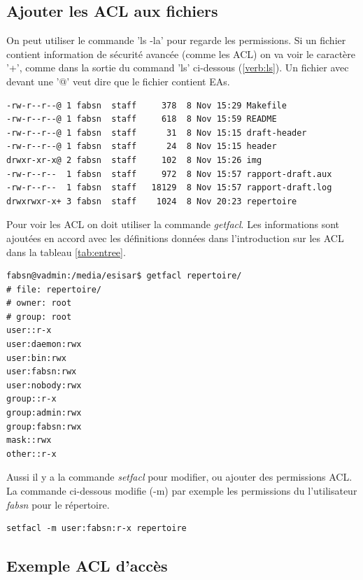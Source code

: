 \subsection*{Ajouter les ACL aux fichiers}

On peut utiliser le commande 'ls -la' pour regarde les permissions. Si un fichier contient information de sécurité avancée (comme les ACL) on va voir le caractère '+', comme dans la sortie du command 'ls' ci-dessous (\ref{verb:ls}). Un fichier avec devant une '@' veut dire que le fichier contient EAs. 

\begin{center}
\label{verb:ls}
\begin{verbatim}
-rw-r--r--@ 1 fabsn  staff     378  8 Nov 15:29 Makefile
-rw-r--r--@ 1 fabsn  staff     618  8 Nov 15:59 README
-rw-r--r--@ 1 fabsn  staff      31  8 Nov 15:15 draft-header
-rw-r--r--@ 1 fabsn  staff      24  8 Nov 15:15 header
drwxr-xr-x@ 2 fabsn  staff     102  8 Nov 15:26 img
-rw-r--r--  1 fabsn  staff     972  8 Nov 15:57 rapport-draft.aux
-rw-r--r--  1 fabsn  staff   18129  8 Nov 15:57 rapport-draft.log
drwxrwxr-x+ 3 fabsn  staff	  1024  8 Nov 20:23 repertoire
\end{verbatim}
\end{center}

Pour voir les ACL on doit utiliser la commande \emph{getfacl}. Les informations sont ajoutées en accord avec les définitions données dans l'introduction sur les ACL dans la tableau \ref{tab:entree}. 

\begin{verbatim}
fabsn@vadmin:/media/esisar$ getfacl repertoire/
# file: repertoire/
# owner: root
# group: root
user::r-x
user:daemon:rwx
user:bin:rwx
user:fabsn:rwx
user:nobody:rwx
group::r-x
group:admin:rwx
group:fabsn:rwx
mask::rwx
other::r-x	
\end{verbatim}

Aussi il y a la commande \emph{setfacl} pour modifier, ou ajouter des permissions ACL. La commande ci-dessous modifie (-m) par exemple les permissions du l'utilisateur \emph{fabsn} pour le répertoire. 

\begin{verbatim}
setfacl -m user:fabsn:r-x repertoire
\end{verbatim}

\subsection*{Exemple ACL d'accès}

